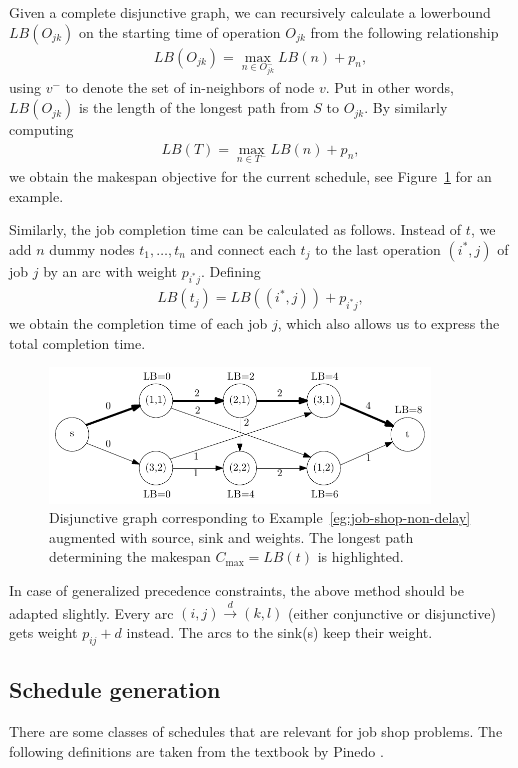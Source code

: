 \documentclass{article}
\theoremstyle{definition}
\theoremstyle{plain}
\begin{document}
Given a complete disjunctive graph, we can recursively calculate a lowerbound
$LB(O_{jk})$ on the starting time of operation $O_{jk}$ from the following
relationship
\begin{align}
  LB(O_{jk}) = \max_{n \in O_{jk}^{-}} LB(n) + p_{n} ,
\end{align}
using $v^{-}$ to denote the set of in-neighbors of node $v$. Put in other words,
$LB(O_{jk})$ is the length of the longest path from $S$ to $O_{jk}$. By
similarly computing
\begin{align}
  LB(T) = \max_{n \in T^{-}} LB(n) + p_{n} ,
\end{align}
we obtain the makespan objective for the current schedule, see
Figure~\ref{fig:augmented-graph} for an example.

Similarly, the job completion time can be calculated as follows.
Instead of $t$, we add $n$ dummy nodes $t_{1}, \dots, t_{n}$ and connect each $t_{j}$ to the last operation $(i^{*},j)$ of job $j$ by an arc with weight $p_{i^{*}j}$.
Defining
\begin{align}
  LB(t_{j}) = LB((i^{*},j)) + p_{i^{*}j} ,
\end{align}
we obtain the completion time of each job $j$, which also allows us to express
the total completion time.

\begin{figure}
  \centering
  \includegraphics[width=0.9\textwidth]{figures/disjunctive-graph-source-sink.pdf}
  \caption{Disjunctive graph corresponding to
    Example~\ref{eg:job-shop-non-delay} augmented with source, sink and weights.
    The longest path determining the makespan $C_{\text{max}} = LB(t)$ is
    highlighted.}
  \label{fig:augmented-graph}
\end{figure}

In case of generalized precedence constraints, the above method should be
adapted slightly. Every arc $(i,j) \xrightarrow{d} (k,l)$ (either conjunctive or
disjunctive) gets weight $p_{ij} + d$ instead. The arcs to the sink(s) keep their weight.


\subsection{Schedule generation}
There are some classes of schedules that are relevant for job shop problems. The
following definitions are taken from the textbook by Pinedo
\cite{pinedoSchedulingTheoryAlgorithms2016}.
\end{document}
